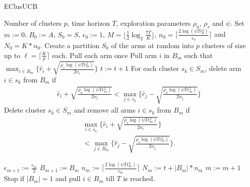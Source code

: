 \begin{algorithm}[!h]
\caption{EClusUCB}
\label{alg:eclusucb}
\begin{algorithmic}
 Number of clusters $p$, time horizon $T$, exploration parameters $\rho_a$, $\rho_s$ and $\psi$.
 Set $m:=0$, $B_{0}:=A$, $S_0 = S$, $\epsilon_{0}:=1$, $M=\big \lfloor \frac{1}{2}\log_{2} \frac{7T}{K}\big\rfloor$, $n_{0}=\bigg\lceil\frac{2\log{(\psi T\epsilon_{0}^{2})}}{\epsilon_{0}}\bigg\rceil$ and  $N_{0}=K*n_{0}$.
\State Create a partition $S_0$ of the arms at random into $p$ clusters of size up to $\ell=\bigg\lceil \frac{K}{p} \bigg\rceil$ each.
\State Pull each arm once
\State Pull arm $i$ in $B_m$ such that $\max_{i\in B_{m}}\bigg\lbrace \hat{r}_{i} + \sqrt{\frac{\rho_{s}\log{(\psi T\epsilon_{m}^{2})}}{2 n_{i}}} \bigg\rbrace$
\State $t:=t+1$
\ArmElim
\State For each cluster $s_k \in S_{m}$, delete arm ${i}\in s_{k}$ from $B_{m}$ if
\begin{align*}
\hat{r}_{i} + \sqrt{\frac{\rho_{a}\log{(\psi T\epsilon_{m}^{2})}}{2 n_{i}}}  < \max_{{j}\in s_{k}}\bigg\lbrace\hat{r}_{j} -\sqrt{\frac{\rho_{a}\log{(\psi T\epsilon_{m}^{2})}}{2 n_{j}}} \bigg\rbrace
\end{align*}
\EndArmElim
\ClusElim
\State Delete cluster $s_{k}\in S_{m}$ and remove all arms $i\in s_{k}$ from $B_{m}$ if 
\begin{align*}
 \max_{{i}\in s_{k}}\bigg\lbrace\hat{r}_{i} + \sqrt{\frac{\rho_{s}\log{(\psi T\epsilon_{m}^{2})}}{2 n_{i}}}\bigg\rbrace \\
 < \max_{{j}\in B_{m}} \bigg\lbrace\hat{r}_{j} - \sqrt{\frac{\rho_{s} \log{(\psi T\epsilon_{m}^{2})}}{2 n_{j}}}\bigg\rbrace.
\end{align*}
\EndClusElim

\ResParam
\State $\epsilon_{m+1}:=\frac{\epsilon_{m}}{2}$\vspace{0.5ex}
\State $B_{m+1}:=B_{m}$
\State $n_{m}:=\bigg\lceil\frac{2\log{(\psi T\epsilon_{m}^{2})}}{\epsilon_{m}}\bigg\rceil$
\State $N_{m}:=t+|B_{m}| * n_{m}$
\State $m:=m+1$
\EndResParam
\State Stop if $|B_{m}|=1$ and pull ${i}\in B_{m}$ till $T$ is reached.
\EndIf
\EndFor
\end{algorithmic}
\end{algorithm}

